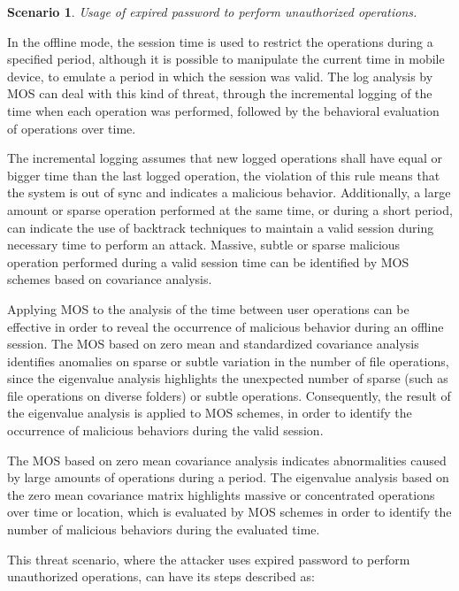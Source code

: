 \documentclass[twocolumn]{svjour3}          	%
\newtheorem{thm}{Scenario}
\begin{document}
\begin{thm}
Usage of expired password to perform unauthorized operations.
\end{thm}

In the offline mode, the session time is used to restrict the operations during a specified period, although it is possible to manipulate the current time in mobile device, to emulate a period in which the session was valid. The log analysis by MOS can deal with this kind of threat, through the incremental logging of the time when each operation was performed, followed by the behavioral evaluation of operations over time. 

The incremental logging assumes that new logged operations shall have equal or bigger time than the last logged operation, the violation of this rule means that the system is out of sync and indicates a malicious behavior. Additionally, a large amount or sparse operation performed at the same time, or during a short period, can indicate the use of backtrack techniques to maintain a valid session during necessary time to perform an attack. Massive, subtle or sparse malicious operation performed during a valid session time can be identified by MOS schemes based on covariance analysis.

Applying MOS to the analysis of the time between user operations can be effective in order to reveal the occurrence of malicious behavior during an offline session. The MOS based on zero mean and standardized covariance analysis identifies anomalies on sparse or subtle variation in the number of file operations, since the eigenvalue analysis highlights the unexpected number of sparse (such as file operations on diverse folders) or subtle operations. Consequently, the result of the eigenvalue analysis is applied to MOS schemes, in order to identify the occurrence of malicious behaviors during the valid session.

The MOS based on zero mean covariance analysis indicates abnormalities caused by large amounts of operations during a period. The eigenvalue analysis based on the zero mean covariance matrix highlights massive or concentrated operations over time or location, which is evaluated by MOS schemes in order to identify the number of malicious behaviors during the evaluated time.

This threat scenario, where the attacker uses expired password to perform unauthorized operations, can have its steps described as:
\end{document}
